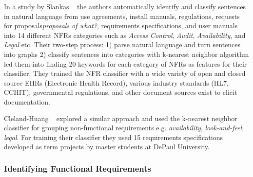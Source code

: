 	In a study by Slankas \etal~\cite{Slankas:2013} the authors automatically
identify and classify sentences in natural language from use agreements, install
manuals, regulations, requests for proposals\emph{proposals of what?},
requirements specifications, and user manuals into 14 different NFRs categories such as 
\emph{Access Control}, \emph{Audit}, \emph{Availability},  and \emph{Legal} etc.
Their two-step process: 1) parse natural language and turn sentences into graphs
2) classify sentences into categories with k-nearest neighbor algorithm led them
into finding 20 keywords for each category of NFRs as features for their
classifier. They trained the NFR classifier
with a wide variety of open and closed source EHRs (Electronic Health Record),
various industry standards (HL7, CCHIT), governmental regulations, and other
document sources exist to elicit documentation.

 	Cleland-Huang \etal~\cite{Cleland-Huang2007} explored a similar approach and
used the k-nearest neighbor classifier for grouping non-functional requirements e.g.
\emph{availability}, \emph{look-and-feel}, \emph{legal}. For training their classifier they used 15 requirements
specifications developed as term projects by master students at DePaul University.\\
\subsubsection{Identifying Functional Requirements}


